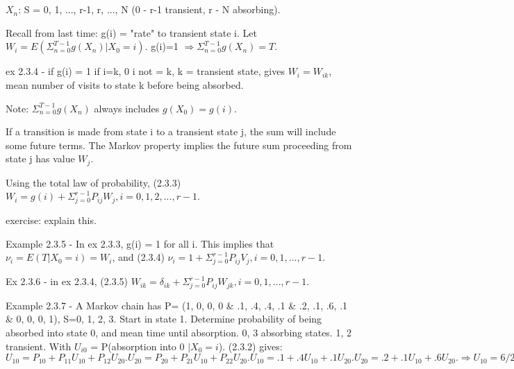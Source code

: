 \documentclass{article}
\begin{document}
\tableofcontents

\section{}

\section{}

\subsection{}
\subsection{}
\subsection{}

$X_n$: S = {0, 1, ..., r-1, r, ..., N} (0 - r-1 transient, r - N absorbing).

Recall from last time: g(i) = "rate" to transient state i.
Let $W_i = E ( \Sigma_{n=0}^{T-1} g(X_n)|X_0=i)$. g(i)=1 $\Rightarrow \Sigma_{n=0}^{T-1}g(X_n)=T$.

ex 2.3.4 - if g(i) = 1 if i=k, 0 i not = k, k = transient state, gives $W_i = W_{ik}$, mean number of visits to state k before being absorbed.

Note: $\Sigma_{n=0}^{T-1}g(X_n)$ always includes $g(X_0)=g(i)$.

If a transition is made from state i to a transient state j, the sum will include some future terms. The Markov property implies the future sum proceeding from state j has value $W_j$.

Using the total law of probability, (2.3.3) $W_i = g(i) + \Sigma_{j=0}^{r-1}P_{ij}W_j, i=0, 1, 2, ..., r-1$.

exercise: explain this.

Example 2.3.5 - In ex 2.3.3, g(i) = 1 for all i. This implies that $\nu_i = E(T|X_0=i)=W_i$, and (2.3.4) $\nu_i = 1 + \Sigma_{j=0}^{r-1}P_{ij}V_j, i=0, 1, ..., r-1$.

Ex 2.3.6 - in ex 2.3.4, (2.3.5) $W_{ik} = \delta_{ik} + \Sigma_{j=0}^{r-1}P_{ij}W_{jk}, i=0, 1, ..., r-1$.

Example 2.3.7 - A Markov chain has P= (1, 0, 0, 0 \& .1, .4, .4, .1 \& .2, .1, .6, .1 \& 0, 0, 0, 1), S={0, 1, 2, 3}. Start in state 1. Determine probability of being absorbed into state 0, and mean time until absorption. 0, 3 absorbing states. 1, 2 transient. With $U_{i0}$ = P(absorption into 0 $| X_0 = i$). (2.3.2) gives: $U_{10} = P_{10} + P_{11}U_{10} + P_{12}U_{20}. U_{20} = P_{20} + P_{21}U_{10} + P_{22}U_{20}. U_{10} = .1 + .4 U_{10} + .1 U_{20}. U_{20} = .2 + .1 U_{10} + .6 U_{20}. \Rightarrow U_{10} = 6/23, U_{20} = 13/23. (2.3.4) \nu_1 = 1 + .4 \nu_1 + .1 \nu_2. \nu_2 = 1 + .1 \nu_1 + .6 \nu_2. \Rightarrow \nu_1 = 50/23, \nu_2 = 70/23.$
\end{document}

